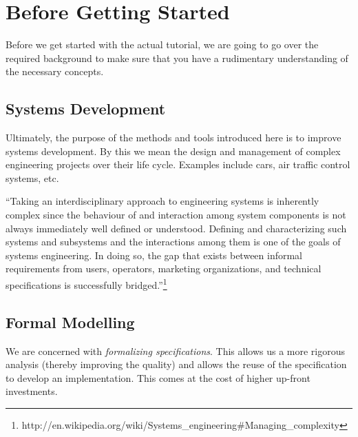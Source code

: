 \section{Before Getting Started}
\label{tutorial_01}

Before we get started with the actual tutorial, we are going to go over the required background to make sure that you have a rudimentary understanding of the necessary concepts.


\subsection{Systems Development}

Ultimately, the purpose of the methods and tools introduced here is to improve systems development.  By this we mean the design and management of complex engineering projects over their life cycle.  Examples include cars, air traffic control systems, etc.

``Taking an interdisciplinary approach to engineering systems is inherently complex since the behaviour of and interaction among system components is not always immediately well defined or understood. Defining and characterizing such systems and subsystems and the interactions among them is one of the goals of systems engineering. In doing so, the gap that exists between informal requirements from users, operators, marketing organizations, and technical specifications is successfully bridged.''\footnote{http://en.wikipedia.org/wiki/Systems\_engineering\#Managing\_complexity}

\subsection{Formal Modelling}

We are concerned with \textit{formalizing specifications}.  This allows us a more rigorous analysis (thereby improving the quality) and allows the reuse of the specification to develop an implementation.  This comes at the cost of higher up-front investments.

